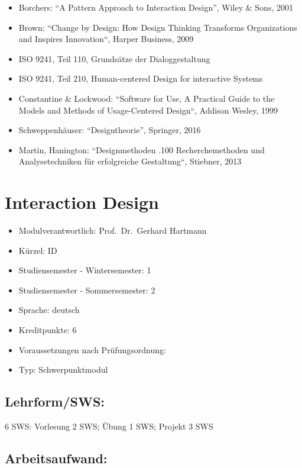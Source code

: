 \begin{itemize}
\tightlist
\item
  Borchers: ``A Pattern Approach to Interaction Design'', Wiley \& Sons,
  2001
\item
  Brown: ``Change by Design: How Design Thinking Transforms
  Organizations and Inspires Innovation``, Harper Business, 2009
\item
  ISO 9241, Teil 110, Grundsätze der Dialoggestaltung
\item
  ISO 9241, Teil 210, Human-centered Design for interactive Systems
\item
  Constantine \& Lockwood: ``Software for Use, A Practical Guide to the
  Models and Methods of Usage-Centered Design``, Addison Wesley, 1999
\item
  Schweppenhäuser: ``Designtheorie'', Springer, 2016
\item
  Martin, Hanington: ``Designmethoden .100 Recherchemethoden und
  Analysetechniken für erfolgreiche Gestaltung``, Stiebner, 2013
\end{itemize}

\chapter{Interaction Design}\label{interaction-design}

\begin{itemize}
\tightlist
\item
  Modulverantwortlich: Prof.~Dr.~Gerhard Hartmann
\item
  Kürzel: ID
\item
  Studiensemester - Wintersemester: 1
\item
  Studiensemester - Sommersemester: 2
\item
  Sprache: deutsch
\item
  Kreditpunkte: 6
\item
  Voraussetzungen nach Prüfungsordnung:
\item
  Typ: Schwerpunktmodul
\end{itemize}

\section*{Lehrform/SWS:}\label{lehrformsws-5}

6 SWS: Vorlesung 2 SWS; Übung 1 SWS; Projekt 3 SWS

\section*{Arbeitsaufwand:}\label{arbeitsaufwand-11}

